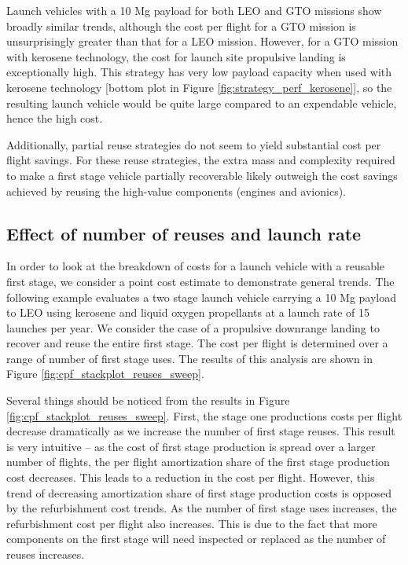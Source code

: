 \documentclass{iaf-iac}
\begin{document}
\begin{multicols}{2}
Launch vehicles with a 10 Mg payload for both LEO and GTO  missions show broadly similar trends, although the cost per flight for a GTO mission is unsurprisingly greater than that for a LEO mission. However, for a GTO mission with kerosene technology, the cost for launch site propulsive landing is exceptionally high. This strategy has very low payload capacity when used with kerosene technology [bottom plot in Figure \ref{fig:strategy_perf_kerosene}], so the resulting launch vehicle would be quite large compared to an expendable vehicle, hence the high cost.

Additionally, partial reuse strategies do not seem to yield substantial cost per flight savings. For these reuse strategies, the extra mass and complexity required to make a first stage vehicle partially recoverable likely outweigh the cost savings achieved by reusing the high-value components (engines and avionics). 

\subsection{Effect of number of reuses and launch rate}

In order to look at the breakdown of costs for a launch vehicle with a reusable first stage, we consider a point cost estimate to demonstrate general trends. The following example evaluates a two stage launch vehicle carrying a 10 Mg payload to LEO using kerosene and liquid oxygen propellants at a launch rate of 15 launches per year. We consider the case of a propulsive downrange landing to recover and reuse the entire first stage. The cost per flight is determined over a range of number of first stage uses. The results of this analysis are shown in Figure \ref{fig:cpf_stackplot_reuses_sweep}.

Several things should be noticed from the results in Figure \ref{fig:cpf_stackplot_reuses_sweep}. First, the stage one productions costs per flight decrease dramatically as we increase the number of first stage reuses. This result is very intuitive -- as the cost of first stage production is spread over a larger number of flights, the per flight amortization share of the first stage production cost decreases. This leads to a reduction in the cost per flight. However, this trend of decreasing amortization share of first stage production costs is opposed by the refurbishment cost trends. As the number of first stage uses increases, the refurbishment cost per flight also increases. This is due to the fact that more components on the first stage will need inspected or replaced  as the number of reuses increases. 


\end{multicols}
\end{document}
